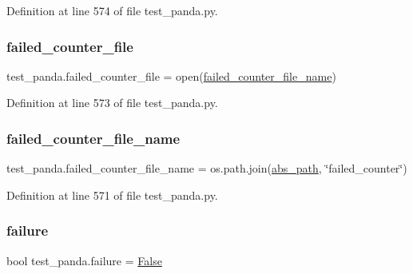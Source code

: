 Definition at line 574 of file test\+\_\+panda.\+py.

\mbox{\label{namespacetest__panda_a78641fc5dd6016d8f6dbae2d57f3e478}} 
\subsubsection{\texorpdfstring{failed\+\_\+counter\+\_\+file}{failed\_counter\_file}}
{\footnotesize\ttfamily test\+\_\+panda.\+failed\+\_\+counter\+\_\+file = open(\hyperlink{namespacetest__panda_a09e8b74e2e77debdfd45401dbc0502c7}{failed\+\_\+counter\+\_\+file\+\_\+name})}



Definition at line 573 of file test\+\_\+panda.\+py.

\mbox{\label{namespacetest__panda_a09e8b74e2e77debdfd45401dbc0502c7}} 
\subsubsection{\texorpdfstring{failed\+\_\+counter\+\_\+file\+\_\+name}{failed\_counter\_file\_name}}
{\footnotesize\ttfamily test\+\_\+panda.\+failed\+\_\+counter\+\_\+file\+\_\+name = os.\+path.\+join(\hyperlink{namespacetest__panda_a78bb23566d04ac65a03195681449d2c0}{abs\+\_\+path}, \char`\"{}failed\+\_\+counter\char`\"{})}



Definition at line 571 of file test\+\_\+panda.\+py.

\mbox{\label{namespacetest__panda_a03abeca3a5e7cb965926a2d7daf20869}} 
\subsubsection{\texorpdfstring{failure}{failure}}
{\footnotesize\ttfamily bool test\+\_\+panda.\+failure = \hyperlink{namespacetest__panda_af93daddc6b1a54e0ad3c68aa4c89eb92}{False}}



